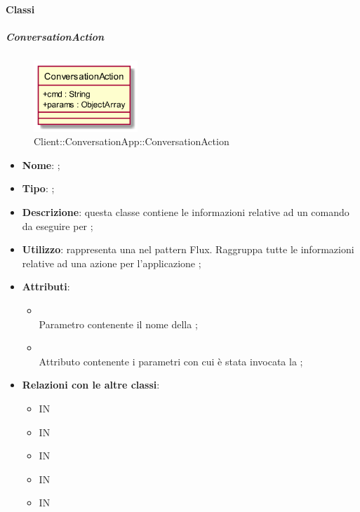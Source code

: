 \paragraph{Classi}
\hypertarget{ConversationAction_label}{\subparagraph{ConversationAction}}
\begin{figure}[h]
	\centering
	\includegraphics[width=0.35\textwidth,height=\textheight,keepaspectratio]{images/ClassConversationAction.png}
	\caption{Client::ConversationApp::ConversationAction}
\end{figure}
\begin{itemize}
	\item \textbf{Nome}: ;
	\item \textbf{Tipo}: ;
	\item \textbf{Descrizione}: questa classe contiene le informazioni relative ad un comando da eseguire per ;
	\item \textbf{Utilizzo}: rappresenta una  nel pattern Flux. Raggruppa tutte le informazioni relative ad una azione per l'applicazione ;
	\item \textbf{Attributi}:
	\begin{itemize}
		\item[]  \\
		Parametro contenente il nome della ;
		\item[]  \\
		Attributo contenente i parametri con cui è stata invocata la ;
	\end{itemize}
	\item \textbf{Relazioni con le altre classi}:
	\begin{itemize}
		\item IN \hyperlink{ConversationActionObserver_label}{}
		\item IN \hyperlink{ConversationActionObservable_label}{}
		\item IN \hyperlink{ConversationActionSubject_label}{}
		\item IN \hyperlink{ConversationDispatcher_label}{}
		\item IN \hyperlink{MessageStore_label}{}
	\end{itemize}
\end{itemize}
\FloatBarrier

